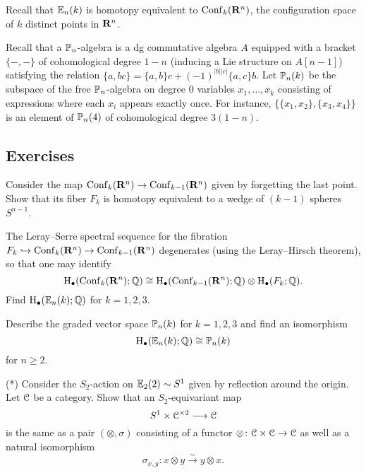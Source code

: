 Recall that $\mathbb{E}_n(k)$ is homotopy equivalent to $\mathrm{Conf}_k(\mathbf{R}^n)$, the configuration space of $k$ distinct points in $\mathbf{R}^n$.

Recall that a $\mathbb{P}_n$-algebra is a dg commutative algebra $A$ equipped with a bracket $\{-, -\}$ of cohomological degree $1-n$ (inducing a Lie structure on $A[n-1]$) satisfying the relation $\{a, bc\} = \{a, b\}c + (-1)^{|b||c|}\{a, c\}b$. Let $\mathbb{P}_n(k)$ be the subspace of the free $\mathbb{P}_n$-algebra on degree $0$ variables $x_1, \dots, x_k$ consisting of expressions where each $x_i$ appears exactly once. For instance, $\{\{x_1, x_2\}, \{x_3, x_4\}\}$ is an element of $\mathbb{P}_n(4)$ of cohomological degree $3(1-n)$.

\subsection{Exercises}
\begin{exercise}
Consider the map $\mathrm{Conf}_k(\mathbf{R}^n)\rightarrow \mathrm{Conf}_{k-1}(\mathbf{R}^n)$ given by forgetting the last point. Show that its fiber $F_k$ is homotopy equivalent to a wedge of $(k-1)$ spheres $S^{n-1}$.
\end{exercise}

\begin{exercise}
The Leray--Serre spectral sequence for the fibration $F_k\hookrightarrow \mathrm{Conf}_k(\mathbf{R}^n)\rightarrow \mathrm{Conf}_{k-1}(\mathbf{R}^n)$ degenerates (using the Leray--Hirsch theorem), so that one may identify
\[\mathrm{H}_\bullet(\mathrm{Conf}_k(\mathbf{R}^n);\mathbb{Q})\cong \mathrm{H}_\bullet(\mathrm{Conf}_{k-1}(\mathbf{R}^n);\mathbb{Q})\otimes \mathrm{H}_\bullet(F_k;\mathbb{Q}).\]
Find $\mathrm{H}_\bullet(\mathbb{E}_n(k);\mathbb{Q})$ for $k=1,2,3$.
\end{exercise}

\begin{exercise}
Describe the graded vector space $\mathbb{P}_n(k)$ for $k=1,2,3$ and find an isomorphism
\[\mathrm{H}_\bullet(\mathbb{E}_n(k);\mathbb{Q})\cong \mathbb{P}_n(k)\]
for $n\geq 2$.
\end{exercise}

\begin{exercise}
(*) Consider the $S_2$-action on $\mathbb{E}_2(2)\sim S^1$ given by reflection around the origin. Let $\mathcal{C}$ be a category. Show that an $S_2$-equivariant map
\[S^1\times \mathcal{C}^{\times 2}\longrightarrow \mathcal{C}\]
is the same as a pair $(\otimes, \sigma)$ consisting of a functor $\otimes\colon \mathcal{C}\times \mathcal{C}\rightarrow \mathcal{C}$ as well as a natural isomorphism
\[\sigma_{x, y}\colon x\otimes y\xrightarrow{\sim} y\otimes x.\]
\end{exercise}

